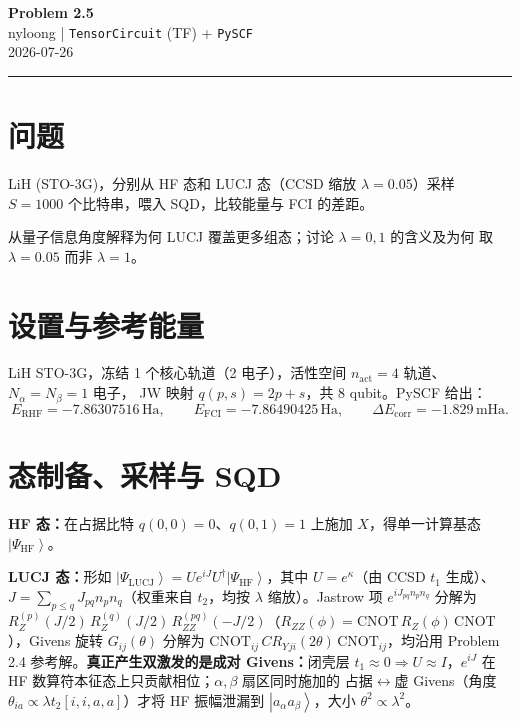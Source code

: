 \documentclass[11pt,a4paper]{article}
\newcommand{\ket}[1]{\left|#1\right\rangle}
\newcommand{\HF}{\text{HF}}
\newcommand{\Ha}{\,\text{Ha}}
\newcommand{\mHa}{\,\text{mHa}}
\newcommand{\Ry}{R_{ZZ}}
\begin{document}
\begin{center}
  {\LARGE\bfseries Problem 2.5}\\[6pt]
  {\normalsize nyloong \quad | \quad
   \texttt{TensorCircuit} (TF) + \texttt{PySCF}}\\[2pt]
  {\small 2026-07-26}
\end{center}
\vspace{4pt}\hrule\vspace{8pt}

\section{问题}
\begin{description}[leftmargin=1.4em,style=nextline]
  \item[\textbf{(a)}]LiH (STO-3G)，分别从 HF 态和 LUCJ 态（CCSD 缩放 $\lambda=0.05$）采样
  $S=1000$ 个比特串，喂入 SQD，比较能量与 FCI 的差距。
  \item[\textbf{(b)}]从量子信息角度解释为何 LUCJ 覆盖更多组态；讨论 $\lambda=0,1$ 的含义及为何
  取 $\lambda=0.05$ 而非 $\lambda=1$。
\end{description}

\section{设置与参考能量}
LiH STO-3G，冻结 1 个核心轨道（2 电子），活性空间 $n_{\text{act}}=4$ 轨道、$N_\alpha=N_\beta=1$ 电子，
JW 映射 $q(p,s)=2p+s$，共 8 qubit。PySCF 给出：
\[
  E_{\text{RHF}}=-7.86307516\Ha,\qquad
  E_{\text{FCI}}=-7.86490425\Ha,\qquad
  \Delta E_{\text{corr}}=-1.829\mHa .
\]

\section{态制备、采样与 SQD}
\textbf{HF 态：}在占据比特 $q(0,0)=0$、$q(0,1)=1$ 上施加 $X$，得单一计算基态 $\ket{\Psi_{\HF}}$。

\textbf{LUCJ 态：}形如 $\ket{\Psi_{\text{LUCJ}}}=U e^{iJ}U^\dagger\ket{\Psi_{\HF}}$，其中
$U=e^\kappa$（由 CCSD $t_1$ 生成）、$J=\sum_{p\le q}J_{pq}n_p n_q$（权重来自 $t_2$，均按
$\lambda$ 缩放）。Jastrow 项 $e^{iJ_{pq}n_p n_q}$ 分解为 $R_Z^{(p)}(J/2)\,R_Z^{(q)}(J/2)\,
\Ry^{(pq)}(-J/2)$（$\Ry(\phi)=\text{CNOT}\,R_Z(\phi)\,\text{CNOT}$），Givens 旋转
$G_{ij}(\theta)$ 分解为 $\text{CNOT}_{ij}\,CR_Y\!{}_{ji}(2\theta)\,\text{CNOT}_{ij}$，均沿用
Problem 2.4 参考解。\textbf{真正产生双激发的是成对 Givens：}闭壳层 $t_1\!\approx\!0\Rightarrow
U\!\approx\!I$，$e^{iJ}$ 在 HF 数算符本征态上只贡献相位；$\alpha,\beta$ 扇区同时施加的
占据$\leftrightarrow$虚 Givens（角度 $\theta_{ia}\!\propto\!\lambda t_2[i,i,a,a]$）才将 HF
振幅泄漏到 $\ket{a_\alpha a_\beta}$，大小 $\theta^2\propto\lambda^2$。
\end{document}
